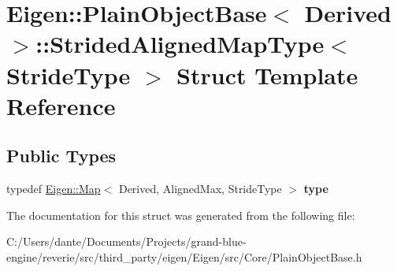 \hypertarget{struct_eigen_1_1_plain_object_base_1_1_strided_aligned_map_type}{}\section{Eigen\+::Plain\+Object\+Base$<$ Derived $>$\+::Strided\+Aligned\+Map\+Type$<$ Stride\+Type $>$ Struct Template Reference}
\label{struct_eigen_1_1_plain_object_base_1_1_strided_aligned_map_type}
\subsection*{Public Types}
\begin{DoxyCompactItemize}
\item 
\mbox{\label{struct_eigen_1_1_plain_object_base_1_1_strided_aligned_map_type_ac9f25f094c2fb27ba267a25b38e4ee69}} 
typedef \mbox{\hyperlink{class_eigen_1_1_map}{Eigen\+::\+Map}}$<$ Derived, Aligned\+Max, Stride\+Type $>$ {\bfseries type}
\end{DoxyCompactItemize}


The documentation for this struct was generated from the following file\+:\begin{DoxyCompactItemize}
\item 
C\+:/\+Users/dante/\+Documents/\+Projects/grand-\/blue-\/engine/reverie/src/third\+\_\+party/eigen/\+Eigen/src/\+Core/Plain\+Object\+Base.\+h\end{DoxyCompactItemize}
